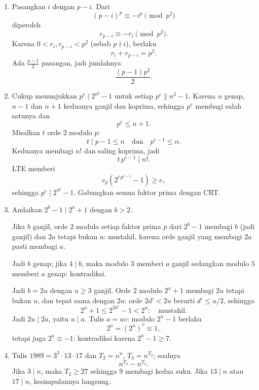 \documentclass[12pt]{scrartcl}
\begin{document}
\begin{enumerate}[resume]
	Jadi $d = p^e$; andaikan $e \ge 2$, maka
	\[ S \equiv p\,a^{p-1} \pmod{p^2} \]
	memberi $p \mid a$, lalu $p \mid b$: kontradiksi dengan kekoprimaan.
	Jadi $d \in \{1, p\}$.

	\item Pasangkan $i$ dengan $p - i$.
	Dari
	\[ (p-i)^p \equiv -i^p \pmod{p^2} \]
	diperoleh
	\[ r_{p-i} \equiv -r_i \pmod{p^2}. \]
	Karena $0 < r_i, r_{p-i} < p^2$ (sebab $p \nmid i$), berlaku
	\[ r_i + r_{p-i} = p^2. \]
	Ada $\frac{p-1}{2}$ pasangan, jadi jumlahnya
	\[ \frac{(p-1)p^2}{2}. \]

	\item Cukup menunjukkan $p^e \mid 2^{n!} - 1$ untuk setiap $p^e \parallel n^2 - 1$.
	Karena $n$ genap, $n - 1$ dan $n + 1$ keduanya ganjil dan koprima,
	sehingga $p^e$ membagi salah satunya dan
	\[ p^e \le n + 1. \]
	Misalkan $t$ orde $2$ modulo $p$:
	\[ t \mid p - 1 \le n \quad \text{dan} \quad p^{e-1} \le n. \]
	Keduanya membagi $n!$ dan saling koprima, jadi
	\[ t\,p^{e-1} \mid n!. \]
	LTE memberi
	\[ v_p(2^{t\,p^{e-1}} - 1) \ge e, \]
	sehingga $p^e \mid 2^{n!} - 1$. Gabungkan semua faktor prima dengan CRT.

	\item Andaikan $2^b - 1 \mid 2^a + 1$ dengan $b > 2$.

	Jika $b$ ganjil, orde $2$ modulo setiap faktor prima $p$ dari $2^b - 1$
	membagi $b$ (jadi ganjil) dan $2a$ tetapi bukan $a$: mustahil,
	karena orde ganjil yang membagi $2a$ pasti membagi $a$.

	Jadi $b$ genap; jika $4 \mid b$, maka modulo $3$ memberi $a$ ganjil
	sedangkan modulo $5$ memberi $a$ genap: kontradiksi.

	Jadi $b = 2u$ dengan $u \ge 3$ ganjil.
	Orde $2$ modulo $2^u + 1$ membagi $2u$ tetapi bukan $u$,
	dan tepat sama dengan $2u$: orde $2d' < 2u$ berarti $d' \le u/2$,
	sehingga
	\[ 2^u + 1 \le 2^{2d'} - 1 < 2^u: \quad \text{mustahil}. \]
	Jadi $2u \mid 2a$, yaitu $u \mid a$.
	Tulis $a = uv$: modulo $2^u - 1$ berlaku
	\[ 2^a = (2^u)^v \equiv 1, \]
	tetapi juga $2^a \equiv -1$: kontradiksi karena $2^u - 1 \ge 7$.

	\item Tulis $1989 = 3^2 \cdot 13 \cdot 17$ dan $T_2 = n^n$, $T_3 = n^{T_2}$;
	soalnya
	\[ n^{T_3} - n^{T_2}. \]
	Jika $3 \mid n$, maka $T_2 \ge 27$ sehingga $9$ membagi kedua suku.
	Jika $13 \mid n$ atau $17 \mid n$, kesimpulannya langsung.


\end{enumerate}
\end{document}
